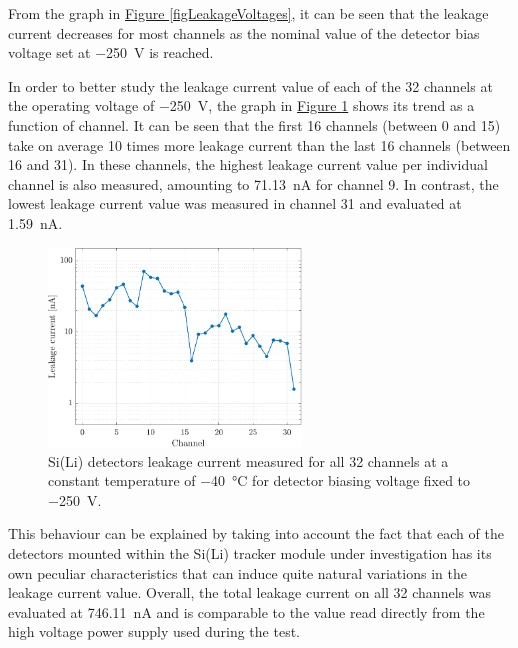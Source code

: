From the graph in \hyperref[figLeakageVoltages]{Figure \ref{figLeakageVoltages}}, it can be seen that the leakage current decreases for most channels as the nominal value of the detector bias voltage set at \SI{-250}{\volt} is reached. 

\par
In order to better study the leakage current value of each of the 32 channels at the operating voltage of \SI{-250}{\volt}, the graph in \hyperref[figLeakage250V]{Figure \ref{figLeakage250V}} shows its trend as a function of channel. It can be seen that the first 16 channels (between 0 and 15) take on average 10 times more leakage current than the last 16 channels (between 16 and 31). In these channels, the highest leakage current value per individual channel is also measured, amounting to \SI{71.13}{\nano\ampere} for channel 9. In contrast, the lowest leakage current value was measured in channel 31 and evaluated at \SI{1.59}{\nano\ampere}.

\begin{figure}[h!]
    \centering
    \includegraphics[width=0.6\textwidth]{Images/chap3/results/leakage_current_ch_250V.pdf}
    \caption{Si(Li) detectors leakage current measured for all 32 channels at a constant temperature of \SI{-40}{\celsius} for detector biasing voltage fixed to \SI{-250}{\volt}.}
    \label{figLeakage250V}
\end{figure}

\par
This behaviour can be explained by taking into account the fact that each of the detectors mounted within the Si(Li) tracker module under investigation has its own peculiar characteristics that can induce quite natural variations in the leakage current value. Overall, the total leakage current on all 32 channels was evaluated at \SI{746.11}{\nano\ampere} and is comparable to the value read directly from the high voltage power supply used during the test.

